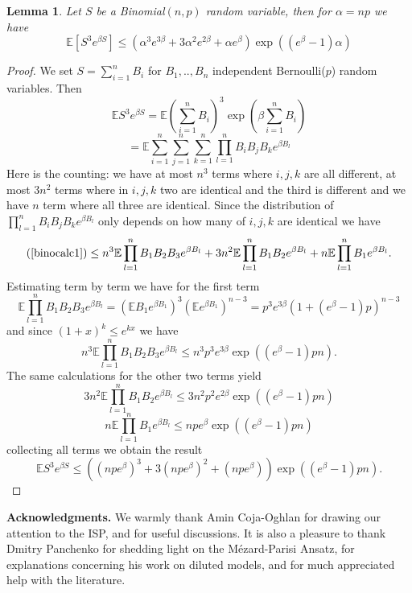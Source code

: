 \documentclass[a4paper,12pt,oneside,reqno]{amsart}
\numberwithin{equation}{section}
\newtheorem{lem}[teor]{Lemma}
\begin{document}
\begin{lem}\label{binomialcomp}
Let $S$ be a Binomial$(n,p)$ random variable, then for $\alpha = n p$ we have 
$$ {{\mathbb{E}}}[S^3 e^{\beta S}] \leq \left( \alpha^3 e^{3\beta}+3\alpha^2 e^{2\beta}+\alpha e^{\beta}\right) \exp\left((e^\beta-1)\alpha\right) $$
\end{lem}
\begin{proof}
We set $S = \sum\limits_{i=1}^n B_i$ for $B_1,..,B_n$ independent Bernoulli($p$) random variables. Then 
$${{\mathbb{E}}} S^3 e^{\beta S} = {{\mathbb{E}}} \left( \sum\limits_{i=1}^n B_i\right)^3 \exp\left(\beta  \sum\limits_{i=1}^n B_i\right)$$
\begin{equation}\label{binocalc1}
= {{\mathbb{E}}} \sum\limits_{i=1}^n\sum\limits_{j=1}^n\sum\limits_{k=1}^n \prod\limits_{l=1}^n B_i B_j B_k e^{\beta B_l}
\end{equation}
Here is the counting: we have at most $n^3$ terms where $i,j,k$ are all different, at most $3n^2$ terms where in $i,j,k$ two are identical and the third is different and we have $n$ term where all three are identical. Since the distribution of $\prod\limits_{l=1}^n B_i B_j B_k e^{\beta B_l}$ only depends on how many of $i,j,k$ are identical we have
\[
(\ref{binocalc1}) \leq n^3 {{\mathbb{E}}} \prod\limits_{l=1}^n B_1 B_2 B_3 e^{\beta B_l} + 3n^2 {{\mathbb{E}}}\prod\limits_{l=1}^n B_1 B_2 e^{\beta B_l}+ n{{\mathbb{E}}} \prod\limits_{l=1}^n B_1 e^{\beta B_l}.
\]
Estimating term by term we have for the first term
\[
{{\mathbb{E}}} \prod\limits_{l=1}^n B_1 B_2 B_3 e^{\beta B_l} = \left({{\mathbb{E}}} B_1 e^{\beta B_1}\right)^3 \left({{\mathbb{E}}} e^{\beta B_1}\right)^{n-3} = p^3e^{3\beta} \left(1+(e^\beta-1)p\right)^{n-3} 
\]
and since $(1+x)^k \leq e^{kx}$ we have 
\[
n^3 {{\mathbb{E}}} \prod\limits_{l=1}^n B_1 B_2 B_3 e^{\beta B_l}\leq n^3 p^3e^{3\beta} \exp\left( (e^\beta-1)p n\right). 
\]
The same calculations for the other two terms yield
\[
3n^2 {{\mathbb{E}}}\prod\limits_{l=1}^n B_1 B_2 e^{\beta B_l} \leq 3n^2 p^2 e^{2\beta}\exp\left( (e^\beta-1)p n\right) 
\]
\[
n{{\mathbb{E}}} \prod\limits_{l=1}^n B_1 e^{\beta B_l} \leq n p e^{\beta}\exp\left( (e^\beta-1)p n\right) 
\]
collecting all terms we obtain the result
\[
{{\mathbb{E}}} S^3 e^{\beta S} \leq \left(\left(n p e^{\beta}\right)^3+3\left(n p e^{\beta}\right)^2+\left(n p e^{\beta}\right)\right) \exp\left( (e^\beta-1)p n\right). 
\]

\end{proof}

{\bf Acknowledgments.} We warmly thank Amin Coja-Oghlan for drawing our attention to the ISP, and for useful discussions. It is also a pleasure to thank Dmitry Panchenko for shedding light on the M\'{e}zard-Parisi Ansatz, for explanations concerning his work on diluted models, and for much appreciated help with the literature. 
\end{document}
